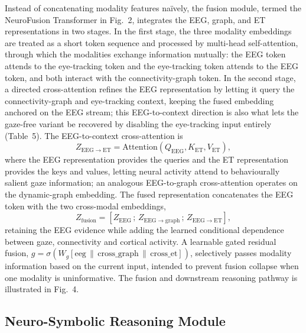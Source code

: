 \documentclass[pdflatex,sn-basic,Numbered]{sn-jnl}
\begin{document}
Instead of concatenating modality features na\"ively, the fusion module, termed the NeuroFusion Transformer in Fig.~2, integrates the EEG, graph, and ET representations in two stages. In the first stage, the three modality embeddings are treated as a short token sequence and processed by multi-head self-attention, through which the modalities exchange information mutually: the EEG token attends to the eye-tracking token and the eye-tracking token attends to the EEG token, and both interact with the connectivity-graph token. In the second stage, a directed cross-attention refines the EEG representation by letting it query the connectivity-graph and eye-tracking context, keeping the fused embedding anchored on the EEG stream; this EEG-to-context direction is also what lets the gaze-free variant be recovered by disabling the eye-tracking input entirely (Table~5). The EEG-to-context cross-attention is
\begin{equation}
Z_{\mathrm{EEG}\to\mathrm{ET}} = \mathrm{Attention}(Q_{\mathrm{EEG}}, K_{\mathrm{ET}}, V_{\mathrm{ET}}), \label{eq12}
\end{equation}
where the EEG representation provides the queries and the ET representation provides the keys and values, letting neural activity attend to behaviourally salient gaze information; an analogous EEG-to-graph cross-attention operates on the dynamic-graph embedding. The fused representation concatenates the EEG token with the two cross-modal embeddings,
\begin{equation}
Z_{\mathrm{fusion}} = [Z_{\mathrm{EEG}} \,;\, Z_{\mathrm{EEG}\to\mathrm{graph}} \,;\, Z_{\mathrm{EEG}\to\mathrm{ET}}], \label{eq13}
\end{equation}
retaining the EEG evidence while adding the learned conditional dependence between gaze, connectivity and cortical activity. A learnable gated residual fusion, $g = \sigma(W_g[\mathrm{eeg}\,\|\,\mathrm{cross\_graph}\,\|\,\mathrm{cross\_et}])$, selectively passes modality information based on the current input, intended to prevent fusion collapse when one modality is uninformative. The fusion and downstream reasoning pathway is illustrated in Fig.~4.

\subsection{Neuro-Symbolic Reasoning Module}\label{subsec2.5.8}
\end{document}

